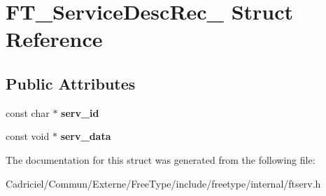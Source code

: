 \hypertarget{struct_f_t___service_desc_rec__}{\section{F\-T\-\_\-\-Service\-Desc\-Rec\-\_\- Struct Reference}
\label{struct_f_t___service_desc_rec__}
}
\subsection*{Public Attributes}
\begin{DoxyCompactItemize}
\item 
\hypertarget{struct_f_t___service_desc_rec___ab706270db01e1398233571f10bd249d4}{const char $\ast$ {\bfseries serv\-\_\-id}}\label{struct_f_t___service_desc_rec___ab706270db01e1398233571f10bd249d4}

\item 
\hypertarget{struct_f_t___service_desc_rec___aa597a33a2b0d099ec32882dc6aa38d59}{const void $\ast$ {\bfseries serv\-\_\-data}}\label{struct_f_t___service_desc_rec___aa597a33a2b0d099ec32882dc6aa38d59}

\end{DoxyCompactItemize}


The documentation for this struct was generated from the following file\-:\begin{DoxyCompactItemize}
\item 
Cadriciel/\-Commun/\-Externe/\-Free\-Type/include/freetype/internal/ftserv.\-h\end{DoxyCompactItemize}
